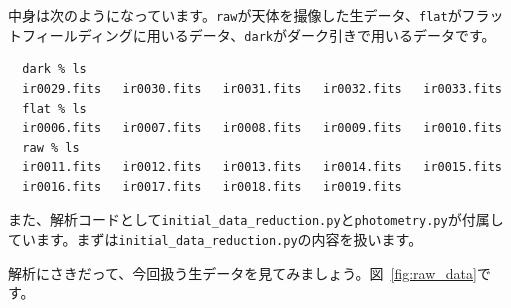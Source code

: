 中身は次のようになっています。\texttt{raw}が天体を撮像した生データ、\texttt{flat}がフラットフィールディングに用いるデータ、\texttt{dark}がダーク引きで用いるデータです。
\begin{verbatim}
  dark % ls
  ir0029.fits   ir0030.fits   ir0031.fits   ir0032.fits   ir0033.fits
  flat % ls
  ir0006.fits   ir0007.fits   ir0008.fits   ir0009.fits   ir0010.fits
  raw % ls
  ir0011.fits   ir0012.fits   ir0013.fits   ir0014.fits   ir0015.fits
  ir0016.fits   ir0017.fits   ir0018.fits   ir0019.fits
\end{verbatim}

また、解析コードとして\texttt{initial\_data\_reduction.py}と\texttt{photometry.py}が付属しています。まずは\texttt{initial\_data\_reduction.py}の内容を扱います。\par
解析にさきだって、今回扱う生データを見てみましょう。図~\ref{fig:raw_data}です。
